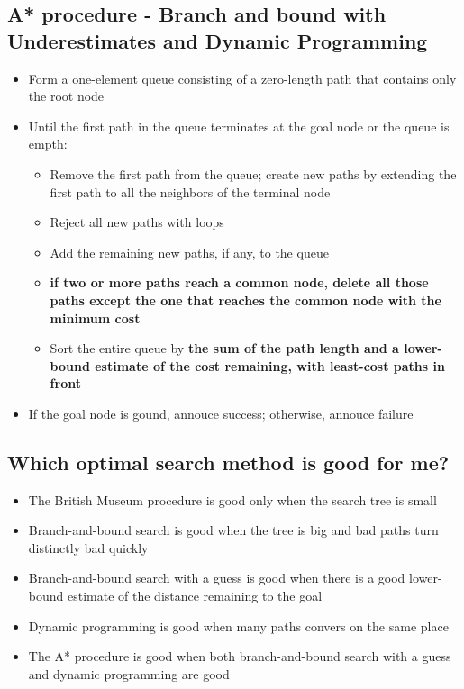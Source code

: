 \subsection{A* procedure - Branch and bound with Underestimates
and Dynamic Programming}

\begin{itemize}
  \item Form a one-element queue consisting of a zero-length path 
    that contains only the root node
  \item Until the first path in the queue terminates at the 
    goal node or the queue is empth:
    \begin{itemize}
      \item Remove the first path from the queue; create new paths 
        by extending the first path to all the neighbors
        of the terminal node
      \item Reject all new paths with loops
      \item Add the remaining new paths, if any, to the queue
      \item \textbf{if two or more paths reach a common node,
        delete all those paths except the one that reaches the
        common node with the minimum cost}
      \item Sort the entire queue by \textbf{the sum of the path
        length and a lower-bound estimate of the cost
        remaining, with least-cost paths in front}
    \end{itemize}
  \item If the goal node is gound, annouce success; otherwise, 
    annouce failure
\end{itemize}

\subsection{Which optimal search method is good for me?}
\begin{itemize}
  \item The British Museum procedure is good only when the 
    search tree is small
  \item Branch-and-bound search is good when the tree is big 
    and bad paths turn distinctly bad quickly
  \item Branch-and-bound search with a guess is good when 
    there is a good lower-bound estimate of the distance
    remaining to the goal
  \item Dynamic programming is good when many paths convers
    on the same place
  \item The A* procedure is good when both branch-and-bound 
    search with a guess and dynamic programming are good
\end{itemize}

